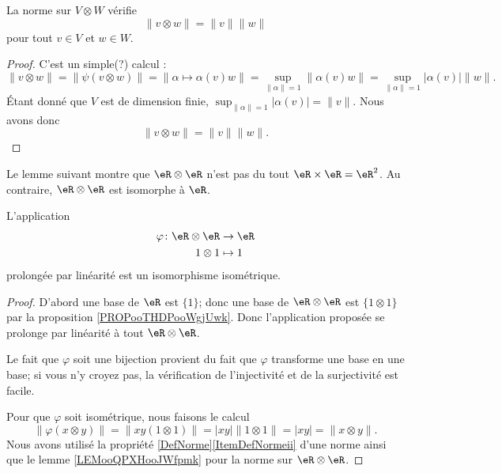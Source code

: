 \begin{lemma}        \label{LEMooQPXHooJWfpmk}
    La norme sur \( V\otimes W\) vérifie
    \begin{equation}
        \| v\otimes w \|=\| v \|\| w \|
    \end{equation}
    pour tout \( v\in V\) et \( w\in W\).
\end{lemma}

\begin{proof}
    C'est un simple(?) calcul :
    \begin{equation}
        \| v\otimes w \|=\| \psi(v\otimes w) \|=\| \alpha\mapsto \alpha(v)w \|=\sup_{\| \alpha \|=1}\| \alpha(v)w \|=\sup_{\| \alpha \|=1}| \alpha(v) |\| w \|.
    \end{equation}
    Étant donné que \( V\) est de dimension finie, \( \sup_{\| \alpha \|=1}| \alpha(v) |=\| v \|\). Nous avons donc
    \begin{equation}
        \| v\otimes w \|=\| v \|\| w \|.
    \end{equation}
\end{proof}

Le lemme suivant montre que \( \eR\otimes \eR\) n'est pas du tout \( \eR\times \eR=\eR^2\). Au contraire, \( \eR\otimes \eR\) est isomorphe à \( \eR\).
\begin{lemma}        \label{LEMooVONEooQpPgcn}
    L'application
    \begin{equation}
        \begin{aligned}
            \varphi\colon \eR\otimes \eR&\to \eR \\
            1\otimes 1&\mapsto 1 
        \end{aligned}
    \end{equation}
    prolongée par linéarité est un isomorphisme isométrique.
\end{lemma}

\begin{proof}
    D'abord une base de \( \eR\) est \( \{ 1 \}\); donc une base de \( \eR\otimes \eR\) est \( \{ 1\otimes 1 \}\) par la proposition \ref{PROPooTHDPooWgjUwk}. Donc l'application proposée se prolonge par linéarité à tout \( \eR\otimes \eR\).

    Le fait que \( \varphi\) soit une bijection provient du fait que \( \varphi\) transforme une base en une base; si vous n'y croyez pas, la vérification de l'injectivité et de la surjectivité est facile.

    Pour que \( \varphi\) soit isométrique, nous faisons le calcul
    \begin{equation}
        \| \varphi(x\otimes y) \|=\| xy(1\otimes 1) \|=| xy |\| 1\otimes 1 \|=| xy |=\| x\otimes y \|.
    \end{equation}
    Nous avons utilisé la propriété \ref{DefNorme}\ref{ItemDefNormeii} d'une norme ainsi que le lemme \ref{LEMooQPXHooJWfpmk} pour la norme sur \( \eR\otimes \eR\).
\end{proof}

